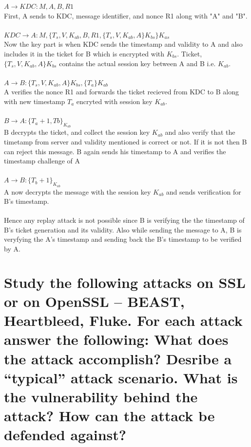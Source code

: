 \documentclass{article}
\begin{document}
 \noindent 
 $A \rightarrow KDC: M,A,B,R1$ \\ First, A sends to KDC, message identifier, and nonce R1 along with "A" and "B".\\ \\
 $KDC \rightarrow A: M,\{T_s,V,K_{ab},B,R1,\{T_s, V, K_{ab},A\}K_{bs}\}K_{as}$\\ Now the key part is when KDC 
 sends the timestamp and validity to A and also includes it in the ticket for B which is encrypted with $K_{bs}$. 
 Ticket, $\{T_s, V, K_{ab},A\}K_{bs}$ contains the actual session key between A and B i.e. $K_{ab}$. \\ \\
 $A \rightarrow B: \{T_s, V, K_{ab},A\}K_{bs},\{T_a\}K_{ab}$ \\ 
 A verifies the nonce R1 and forwards the ticket recieved from KDC to B along with new timestamp $T_a$ encryted with session key $K_{ab}$. \\ \\ 
 $B \rightarrow A: \{T_a+1,Tb\}_{K_{ab}}$ \\
 B decrypts the ticket, and collect the session key $K_{ab}$ and also verify that the timetamp from server and validity mentioned is correct or not.
 If it is not then B can reject this message. B again sends his timestamp to A and verifies the timestamp challenge of A\\ \\
 $A \rightarrow B: \{T_b+1\}_{K_{ab}}$ \\
 A now decrypts the message with the session key $K_{ab}$ and sends verification for B's timestamp. \\ \\
 
 Hence any replay attack is not possible since B is verifying the the timestamp of B's ticket generation and its validity.
 Also while sending the message to A, B is veryfying the A's timestamp and sending back the B's timestamp to be verified by A.

 
 

 
\section{Study the following attacks on SSL or on OpenSSL – BEAST, Heartbleed, Fluke. For each
attack answer the following:
What does the attack accomplish?
Desribe a “typical” attack scenario.
What is the vulnerability behind the attack?
How can the attack be defended against?}
\end{document}
